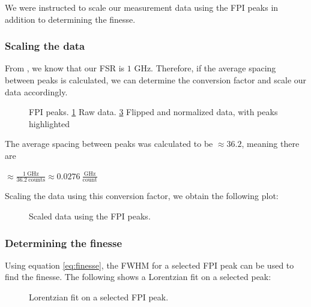 \documentclass{article}
\begin{document}
We were instructed to scale our measurement data using the FPI peaks in addition to determining the finesse.

\subsubsection{Scaling the data}

From \cite{jung_2018_dopplerfree}, we know that our FSR is $1$ GHz. Therefore, if the average spacing between peaks is calculated, we can determine the conversion factor and scale our data accordingly.

\begin{figure}[h]
	\centering
	\begin{subfigure}[t]{0.45\textwidth}
		\centering
		\scalebox{0.5}{}
		\caption{}
		\label{fig:peaks}
	\end{subfigure}
	\begin{subfigure}[t]{0.45\textwidth}
		\centering
		\scalebox{0.5}{}
		\caption{}
		\label{fig:normalized_peaks}
	\end{subfigure}
	\caption{FPI peaks. \ref{fig:peaks} Raw data. \ref{fig:normalized_peaks} Flipped and normalized data, with peaks highlighted}
\end{figure}

The average spacing between peaks was calculated to be $\approx 36.2$, meaning there are

$\approx \frac{1 \ \text{GHz}}{36.2 \ \text{counts}} \approx 0.0276 \ \frac{\text{GHz}}{\text{count}}$ 

Scaling the data using this conversion factor, we obtain the following plot:

\begin{figure}[h]
	\centering
	
	\caption{Scaled data using the FPI peaks.}
	\label{fig:scaled_data}
\end{figure}

\pagebreak{}

\subsubsection{Determining the finesse}

Using equation \ref{eq:finesse}, the FWHM for a selected FPI peak can be used to find the finesse. The following shows a Lorentzian fit on a selected peak:

\begin{figure}[h]
	\centering
	
	\caption{Lorentzian fit on a selected FPI peak.}
	\label{fig:lorentzian_fit}
\end{figure}
\end{document}

